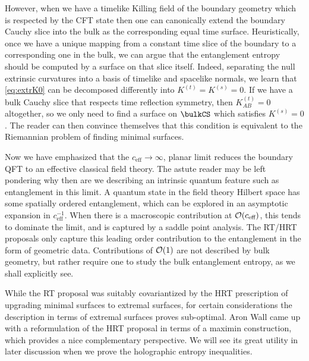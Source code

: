 \documentclass[12pt,openany]{book}
\begin{document}
However, when we have a timelike Killing field of the boundary geometry which is respected by the CFT state then one can canonically extend the boundary Cauchy slice into the bulk as the corresponding equal time surface.  Heuristically, once we have  a unique mapping from a constant time slice of the boundary to a corresponding one in the bulk, we can argue that the entanglement entropy should be computed by a surface on that slice itself. Indeed, separating the null extrinsic curvatures into a basis of timelike and spacelike normals, we learn that \eqref{eq:extrK0} can be decomposed differently into $K^{(t)} = K^{(s)} = 0$.  If we have a bulk Cauchy slice that respects time reflection symmetry, then $K^{(t)}_{AB}  =0$ altogether, so we only need to find a surface on $\bulkCS$ which satisfies $K^{(s)} =0$. The reader can then convince themselves that this condition is equivalent to the Riemannian problem of finding minimal surfaces.

Now we have emphasized that the $c_\text{eff} \to \infty$, planar limit reduces the boundary QFT to an effective classical field theory. The astute reader may be left pondering why then are we describing an intrinsic quantum feature such as entanglement in this limit. A quantum state in the field theory Hilbert space has some spatially ordered entanglement, which can be explored in an  asymptotic expansion in $c_\text{eff}^{-1}$. When there is a macroscopic contribution at ${\cal O}(c_\text{eff})$, this tends to dominate the limit, and is  captured by a saddle point analysis. The RT/HRT proposals only capture this leading order contribution to the entanglement in the form of  geometric data. Contributions of ${\cal O}(1)$ are not described by bulk geometry, but rather require one to study the bulk entanglement entropy, as we shall explicitly see.



While the RT proposal was suitably covariantized by the HRT prescription of upgrading minimal surfaces to extremal surfaces, for certain considerations the description in terms of extremal surfaces proves sub-optimal. Aron Wall \cite{Wall:2012uf} came up with a reformulation of the HRT proposal in terms of a maximin construction, which provides a nice complementary perspective. We will see its great utility in later discussion when we prove the holographic entropy inequalities.
\end{document}
